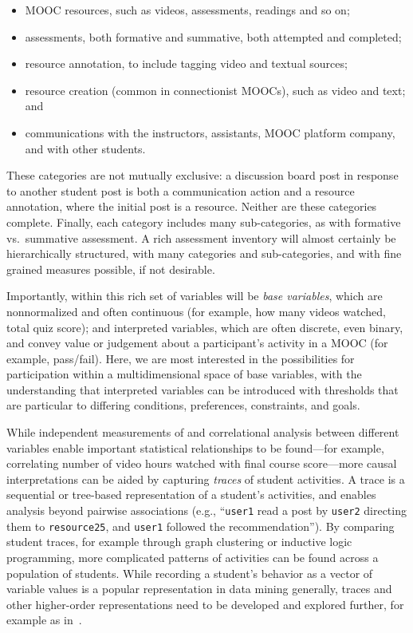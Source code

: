\begin{itemize}

\item MOOC resources,
such as videos, assessments, readings and so on;

\item assessments, both
formative and summative, both attempted and completed; 

\item resource
annotation, to include tagging video and textual sources; 

\item resource
creation (common in connectionist MOOCs), such as video and text; and

\item communications with the instructors, assistants, MOOC platform company,
and with other students.

\end{itemize}

These categories are not mutually exclusive:  a discussion board
post in response to another student post is both a communication action
and a resource annotation, where the initial post
is a resource.  Neither are these categories
complete. Finally, each category includes many
sub-categories, as with  formative vs.\ summative
assessment. A rich assessment inventory will almost certainly be
hierarchically structured, with many categories and sub-categories, and
with fine grained measures possible, if not desirable.

Importantly, within this rich set of variables will be \emph{base variables},
which are nonnormalized and often continuous (for example, how many videos
watched, total quiz score); and interpreted variables, which are often
discrete, even binary, and convey value or judgement about a
participant's activity in a MOOC (for example, pass/fail). Here, we
are most interested in the possibilities for participation within a
multidimensional space of base variables, with the understanding that
interpreted variables can be introduced with thresholds that are
particular to differing conditions, preferences, constraints, and goals.

While independent measurements of and correlational analysis between
different variables 
enable important statistical relationships to be found---for example,
correlating number of video hours watched with final course score---more causal
interpretations can be aided by capturing \emph{traces} of student
activities. A trace is a sequential or tree-based representation of a
student's activities, and enables analysis beyond pairwise associations
(e.g., ``\texttt{user1} read a post by \texttt{user2} directing them to
\texttt{resource25},  and
\texttt{user1} followed the recommendation''). By comparing student traces, for
example through graph clustering or inductive logic programming, more
complicated patterns of activities can be found across a population of
students. While recording a student's behavior as a vector of variable
values is a popular representation in data mining generally, traces and
other higher-order representations need to be developed and explored
further, for example as in~\cite{activity-tracing}.  

